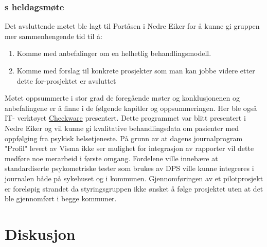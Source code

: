 \documentclass[11pt]{report} %
\begin{document}
                  \subsection{s heldagsmøte}\label{sec:agr_6}
                    Det avsluttende møtet ble lagt til Portåsen i Nedre Eiker for å kunne gi gruppen mer sammenhengende tid til å:
                      \begin{enumerate}
                        \item Komme med anbefalinger om en helhetlig behandlingsmodell.\\
                        \item Komme med forslag til konkrete prosjekter som man kan jobbe videre etter dette for-prosjektet er avsluttet\\
                      \end{enumerate}
                    Møtet oppsummerte i stor grad de foregående møter og konklusjonenen og anbefalingene er å finne i de følgende kapitler og oppsummeringen. Her ble også IT- verktøyet \href{http://checkware.com/}{Checkware} presentert. Dette programmet var blitt presentert i Nedre Eiker og vil kunne gi kvalitative behandlingsdata om pasienter med oppfølging fra psykisk helsetjeneste. På grunn av at dagens journalprogram "Profil" levert av Visma ikke ser mulighet for integrasjon av rapporter vil dette medføre noe merarbeid i første omgang. Fordelene ville innebære at standardiserte psykometriske tester som brukes av DPS ville kunne integreres i journalen både på sykehuset og i kommunen. \label{cw_pilot}Gjennomføringen av et pilotprosjekt er foreløpig strandet da styringsgruppen ikke ønsket å følge prosjektet uten at det ble gjennomført i begge kommuner.


              \chapter{Diskusjon}\label{chap:disk}
\end{document}
